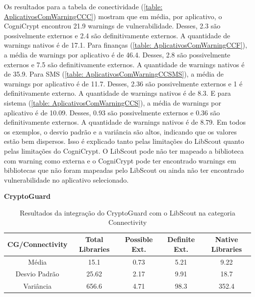 Os resultados para a tabela de conectividade (\ref{table: AplicativosComWarningCCC}) mostram que em média, por aplicativo, o CogniCrypt encontrou 21.9 warnings de vulnerabilidade. Desses, 2.3 são possivelmente externos e 2.4 são definitivamente externos. A quantidade de warnings nativos é de 17.1.
Para finanças (\ref{table: AplicativosComWarningCCF}), a média de warnings por aplicativo é de 46.4. Desses, 2.8 são possivelmente externos e 7.5 são definitivamente externos. A quantidade de warnings nativos é de 35.9. 
Para SMS (\ref{table: AplicativosComWarningCCSMS}), a média de warnings por aplicativo é de 11.7. Desses, 2.36 são possivelmente externos e 1 é definitivamente externo. A quantidade de warnings nativos é de 8.3.
E para sistema (\ref{table: AplicativosComWarningCCS}), a média de warnings por aplicativo é de 10.09. Desses, 0.93 são possivelmente externos e 0.36 são definitivamente externos. A quantidade de warnings nativos é de 8.79.
Em todos os exemplos, o desvio padrão e a variância são altos, indicando que os valores estão bem dispersos. Isso é explicado tanto pelas limitações do LibScout quanto pelas limitações do CogniCrypt. \cite{perception_developers} O LibScout pode não ter mapeado a biblioteca com warning como externa \cite{LibScout} e o CogniCrypt pode ter encontrado warnings em bibliotecas que não foram mapeadas pelo LibScout ou ainda não ter encontrado vulnerabilidade no aplicativo selecionado. \cite{perception_developers}

\textbf{CryptoGuard}

\begin{table}[!htbp]
  \centering
  \small
  \begin{tabular}{|c|c|c|c|c|}
    \hline
    \textbf{CG/Connectivity} & \textbf{Total Libraries} & \textbf{Possible Ext.} & \textbf{Definite Ext.} & \textbf{Native Libraries} \\
    \hline
    Média & \num{15.1} & \num{0.73} & \num{5.21} & \num{9.22} \\
    Desvio Padrão & \num{25.62} & \num{2.17} & \num{9.91} & \num{18.7} \\
    Variância & \num{656.6} & \num{4.71} & \num{98.3} & \num{352.4} \\
    \hline
  \end{tabular}
  \caption{Resultados da integração do CryptoGuard com o LibScout na categoria Connectivity}
  \label{table: AplicativosComWarningCGC}
\end{table}


